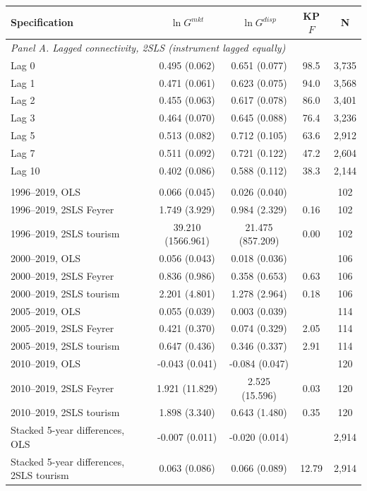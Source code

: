 \begin{tabular}{lcccc}
\toprule
Specification & $\ln G^{mkt}$ & $\ln G^{disp}$ & KP $F$ & N \\
\midrule
\multicolumn{5}{l}{\emph{Panel A. Lagged connectivity, 2SLS (instrument lagged equally)}}\\
Lag 0 & 0.495\sym{***} (0.062) & 0.651\sym{***} (0.077) & 98.5 & 3,735 \\
Lag 1 & 0.471\sym{***} (0.061) & 0.623\sym{***} (0.075) & 94.0 & 3,568 \\
Lag 2 & 0.455\sym{***} (0.063) & 0.617\sym{***} (0.078) & 86.0 & 3,401 \\
Lag 3 & 0.464\sym{***} (0.070) & 0.645\sym{***} (0.088) & 76.4 & 3,236 \\
Lag 5 & 0.513\sym{***} (0.082) & 0.712\sym{***} (0.105) & 63.6 & 2,912 \\
Lag 7 & 0.511\sym{***} (0.092) & 0.721\sym{***} (0.122) & 47.2 & 2,604 \\
Lag 10 & 0.402\sym{***} (0.086) & 0.588\sym{***} (0.112) & 38.3 & 2,144 \\
\addlinespace\multicolumn{5}{l}{\emph{Panel B. Long differences, cross-section with continent FE}}\\
1996--2019, OLS & 0.066 (0.045) & 0.026 (0.040) &  & 102 \\
1996--2019, 2SLS Feyrer & 1.749 (3.929) & 0.984 (2.329) & 0.16 & 102 \\
1996--2019, 2SLS tourism & 39.210 (1566.961) & 21.475 (857.209) & 0.00 & 102 \\
2000--2019, OLS & 0.056 (0.043) & 0.018 (0.036) &  & 106 \\
2000--2019, 2SLS Feyrer & 0.836 (0.986) & 0.358 (0.653) & 0.63 & 106 \\
2000--2019, 2SLS tourism & 2.201 (4.801) & 1.278 (2.964) & 0.18 & 106 \\
2005--2019, OLS & 0.055 (0.039) & 0.003 (0.039) &  & 114 \\
2005--2019, 2SLS Feyrer & 0.421 (0.370) & 0.074 (0.329) & 2.05 & 114 \\
2005--2019, 2SLS tourism & 0.647 (0.436) & 0.346 (0.337) & 2.91 & 114 \\
2010--2019, OLS & -0.043 (0.041) & -0.084\sym{*} (0.047) &  & 120 \\
2010--2019, 2SLS Feyrer & 1.921 (11.829) & 2.525 (15.596) & 0.03 & 120 \\
2010--2019, 2SLS tourism & 1.898 (3.340) & 0.643 (1.480) & 0.35 & 120 \\
Stacked 5-year differences, OLS & -0.007 (0.011) & -0.020 (0.014) &  & 2,914 \\
Stacked 5-year differences, 2SLS tourism & 0.063 (0.086) & 0.066 (0.089) & 12.79 & 2,914 \\
\bottomrule
\end{tabular}